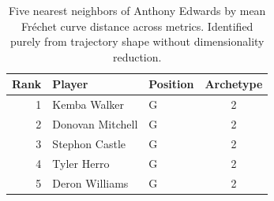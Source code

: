 \begin{table}[htbp]
  \centering\small
  \begin{tabular}{rllc}
    \toprule
    Rank & Player & Position & Archetype \\
    \midrule
    1 & Kemba Walker & G & 2 \\
    2 & Donovan Mitchell & G & 2 \\
    3 & Stephon Castle & G & 2 \\
    4 & Tyler Herro & G & 2 \\
    5 & Deron Williams & G & 2 \\
    \bottomrule
  \end{tabular}
  \caption{Five nearest neighbors of Anthony Edwards by mean Fr\'{e}chet curve distance across metrics. Identified purely from trajectory shape without dimensionality reduction.}
  \label{tab:Anthony_Edwards_frechet_curve_neighbors}
\end{table}

